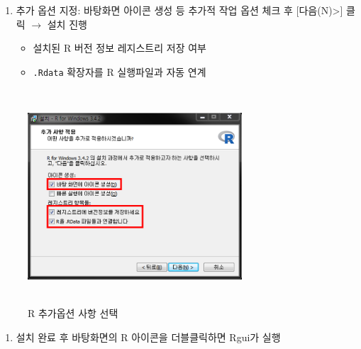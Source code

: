 \documentclass[11pt,a4paper]{book}
\providecommand{\tightlist}{%
  \setlength{\itemsep}{0pt}\setlength{\parskip}{0pt}}
\theoremstyle{definition}
\theoremstyle{definition}
\theoremstyle{definition}
\theoremstyle{remark}
\begin{document}
\begin{enumerate}
\def\labelenumi{\arabic{enumi}.}
\setcounter{enumi}{14}
\tightlist
\item
  추가 옵션 지정: 바탕화면 아이콘 생성 등 추가적 작업 옵션 체크 후
  {[}다음(N)\textgreater{}{]} 클릭 \(\rightarrow\) 설치 진행

  \begin{itemize}
  \tightlist
  \item
    설치된 R 버전 정보 레지스트리 저장 여부
  \item
    \texttt{.Rdata} 확장자를 R 실행파일과 자동 연계
  \end{itemize}
\end{enumerate}

\begin{figure}[H]
{
  \centering
  \includegraphics[width = 8cm, height = 8cm]{Figures/R-install-F09.png}
  \caption[R 추가옵션 사항 선택]{R 추가옵션 사항 선택}\label{fig:R-install-14}
}
\end{figure}

\begin{enumerate}
\def\labelenumi{\arabic{enumi}.}
\setcounter{enumi}{15}
\tightlist
\item
  설치 완료 후 바탕화면의 R 아이콘을 더블클릭하면 Rgui가 실행
\end{enumerate}
\end{document}
